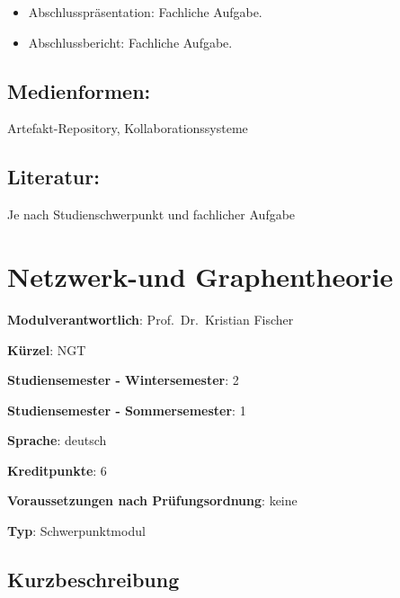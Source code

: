 \begin{itemize}
\tightlist
\item
  Abschlusspräsentation: Fachliche Aufgabe.
\item
  Abschlussbericht: Fachliche Aufgabe.
\end{itemize}

\section*{Medienformen:}\label{medienformen-10}

Artefakt-Repository, Kollaborationssysteme

\section*{Literatur:}\label{literatur-10}

Je nach Studienschwerpunkt und fachlicher Aufgabe

\chapter{Netzwerk-und Graphentheorie}\label{netzwerk-und-graphentheorie}

\begin{modulHead}
\textbf{Modulverantwortlich}: Prof.~Dr.~Kristian
Fischer
\end{modulHead}
\begin{modulHead}
\textbf{Kürzel}:
NGT
\end{modulHead}
\begin{modulHead}
\textbf{Studiensemester -
Wintersemester}:
2
\end{modulHead}
\begin{modulHead}
\textbf{Studiensemester -
Sommersemester}: 1
\end{modulHead}
\begin{modulHead}
\textbf{Sprache}:
deutsch
\end{modulHead}
\begin{modulHead}
\textbf{Kreditpunkte}:
6
\end{modulHead}
\begin{modulHead}
\textbf{Voraussetzungen nach
Prüfungsordnung}: keine
\end{modulHead}
\begin{modulHead}
\textbf{Typ}:
Schwerpunktmodul
\end{modulHead}


\section*{Kurzbeschreibung}\label{kurzbeschreibung-10}

